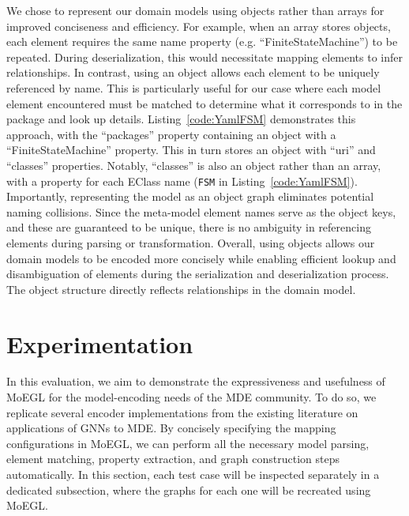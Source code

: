 \documentclass[journal,article,submit,moreauthors,technologies]{Definitions/mdpi}
\newcommand{\rev}[1]{#1}
\begin{document}
We chose to represent our domain models using objects rather than arrays for improved conciseness and efficiency.
For example, when an array stores objects, each element requires the same name property (e.g. ``FiniteStateMachine'') to be repeated. During deserialization, this would necessitate mapping elements to infer relationships. In contrast, using an object allows each element to be uniquely referenced by name. This is particularly useful for our case where each model element encountered must be matched to determine what it corresponds to in the package and look up details. Listing~\ref{code:YamlFSM} demonstrates this approach, with the ``packages'' property containing an object with a ``FiniteStateMachine'' property. This in turn stores an object with ``uri'' and ``classes'' properties. Notably, ``classes'' is also an object rather than an array, with a property for each EClass name (\rev{\texttt{FSM} in Listing~\ref{code:YamlFSM}}). Importantly, representing the model as an object graph eliminates potential naming collisions. Since the meta-model element names serve as the object keys, and these are guaranteed to be unique, there is no ambiguity in referencing elements during parsing or transformation. Overall, using objects allows our domain models to be encoded more concisely while enabling efficient lookup and disambiguation of elements during the serialization and deserialization process. The object structure directly reflects relationships in the domain model.

\section{Experimentation} \label{Sec:Experiments}

In this evaluation, we aim to demonstrate the expressiveness and usefulness of MoEGL for the model-encoding needs of the MDE community.
To do so, we replicate several encoder implementations from the existing literature on applications of GNNs to MDE. By concisely specifying the mapping configurations in MoEGL, we can perform all the necessary model parsing, element matching, property extraction, and graph construction steps automatically. In this section, each test case will be inspected separately in a dedicated subsection, where the graphs for each one will be recreated using MoEGL.
\end{document}
